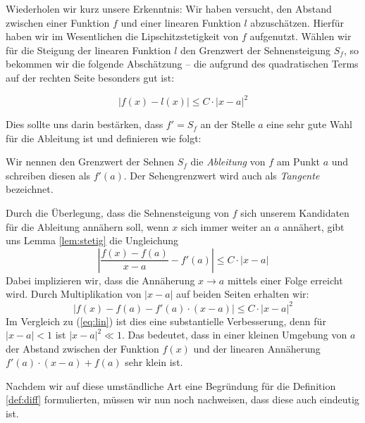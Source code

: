 Wiederholen wir kurz unsere Erkenntnis: Wir haben versucht, den Abstand zwischen einer Funktion $f$ und einer linearen Funktion $l$ abzuschätzen. Hierfür haben wir im Wesentlichen die Lipschitzstetigkeit von $f$ aufgenutzt. Wählen wir für die Steigung der linearen Funktion $l$ den Grenzwert der Sehnensteigung $S_f$, so bekommen wir die folgende Abschätzung -- die aufgrund des quadratischen Terms auf der rechten Seite besonders gut ist:

\begin{equation}
\left| f(x)-l(x) \right| \le C\cdot |x-a|^2
\end{equation}

Dies sollte uns darin bestärken, dass $f'=S_f$ an der Stelle $a$ eine sehr gute Wahl für die Ableitung ist und definieren wie folgt:

\begin{definition}\label{def:diff}
Wir nennen den Grenzwert der Sehnen $S_f$ die \emph{Ableitung} von $f$ am Punkt $a$ und schreiben diesen als $f'(a)$. Der Sehengrenzwert wird auch als \emph{Tangente} bezeichnet. 
\end{definition}

\bigskip

Durch die Überlegung, dass die Sehnensteigung von $f$ sich unserem Kandidaten für die Ableitung annähern soll, wenn $x$ sich immer weiter an $a$ annähert, gibt uns Lemma \ref{lem:stetig} die Ungleichung
\[
\left| \frac{f(x)-f(a)}{x-a} - f'(a) \right| \le C \cdot |x-a|
\]
Dabei implizieren wir, dass die Annäherung $x\rightarrow a$ mittels einer Folge erreicht wird. Durch Multiplikation von $|x-a|$ auf beiden Seiten erhalten wir:
\[
|f(x)-f(a) -f'(a)\cdot (x-a)| \le C\cdot |x-a|^2
\]
Im Vergleich zu (\ref{eq:lin}) ist dies eine substantielle Verbesserung, denn für $|x-a|<1$ ist $|x-a|^2\ll 1$. Das bedeutet, dass in einer kleinen Umgebung von $a$ der Abstand zwischen der Funktion $f(x)$ und der linearen Annäherung $f'(a)\cdot (x-a)+f(a)$ sehr klein ist.

Nachdem wir auf diese umständliche Art eine Begründung für die Definition \ref{def:diff} formulierten, müssen wir nun noch nachweisen, dass diese auch eindeutig ist. 

